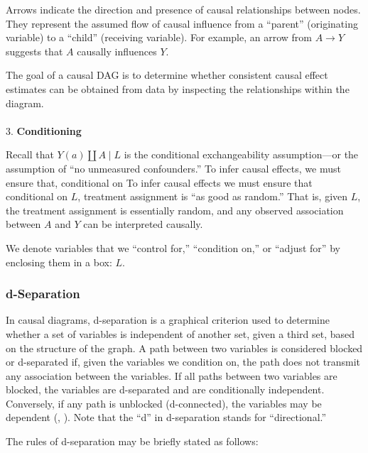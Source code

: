 \documentclass[
  singlecolumn]{article}
\makeatletter
\let\oldparagraph\paragraph
\renewcommand{\paragraph}{
    \@ifstar
      \xxxParagraphStar
      \xxxParagraphNoStar
  }
\newcommand{\xxxParagraphStar}[1]{\oldparagraph*{#1}\mbox{}}
\newcommand{\xxxParagraphNoStar}[1]{\oldparagraph{#1}\mbox{}}
\makeatother
\begin{document}
Arrows indicate the direction and presence of causal relationships
between nodes. They represent the assumed flow of causal influence from
a ``parent'' (originating variable) to a ``child'' (receiving variable).
For example, an arrow from \(A \rightarrow Y\) suggests that \(A\)
causally influences \(Y\).

The goal of a causal DAG is to determine whether consistent causal
effect estimates can be obtained from data by inspecting the
relationships within the diagram.

\paragraph{\texorpdfstring{3.
\textbf{Conditioning}}{3. Conditioning}}\label{conditioning}

Recall that \(Y(a) \coprod A \mid L\) is the conditional exchangeability
assumption---or the assumption of ``no unmeasured confounders.'' To
infer causal effects, we must ensure that, conditional on To infer
causal effects we must ensure that conditional on \(L\), treatment
assignment is ``as good as random.'' That is, given \(L\), the treatment
assignment is essentially random, and any observed association between
\(A\) and \(Y\) can be interpreted causally.

We denote variables that we ``control for,'' ``condition on,'' or
``adjust for'' by enclosing them in a box: \(\boxed{L}\).

\subsubsection{d-Separation}\label{d-separation}

In causal diagrams, d-separation is a graphical criterion used to
determine whether a set of variables is independent of another set,
given a third set, based on the structure of the graph. A path between
two variables is considered blocked or d-separated if, given the
variables we condition on, the path does not transmit any association
between the variables. If all paths between two variables are blocked,
the variables are d-separated and are conditionally independent.
Conversely, if any path is unblocked (d-connected), the variables may be
dependent (,
). Note that the ``d'' in d-separation
stands for ``directional.''

The rules of d-separation may be briefly stated as follows:
\end{document}
